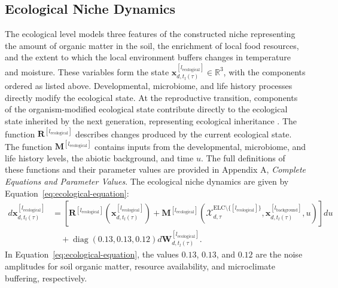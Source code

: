 \documentclass[11pt]{article}
\newcommand{\ELC}{\mathrm{ELC}}
\begin{document}
\subsection{Ecological Niche Dynamics}
The ecological level models three features of the constructed niche representing the amount of organic matter in the soil, the enrichment of local food resources, and the extent to which the local environment buffers changes in temperature and moisture. These variables form the state $\mathbf{x}^{[l_{\mathrm{ecological}}]}_{d,t_l(\tau)}\in\mathbb{R}^{3}$, with the components ordered as listed above. Developmental, microbiome, and life history processes directly modify the ecological state. At the reproductive transition, components of the organism-modified ecological state contribute directly to the ecological state inherited by the next generation, representing ecological inheritance \cite{odlingsmee2003,laland2016}. The function $\mathbf{R}^{[l_{\mathrm{ecological}}]}$ describes changes produced by the current ecological state. The function $\mathbf{M}^{[l_{\mathrm{ecological}}]}$ contains inputs from the developmental, microbiome, and life history levels, the abiotic background, and time $u$. The full definitions of these functions and their parameter values are provided in Appendix A, \textit{Complete Equations and Parameter Values}. The ecological niche dynamics are given by Equation~\ref{eq:ecological-equation}:
\begin{equation}
\begin{aligned}
d\mathbf{x}^{[l_{\mathrm{ecological}}]}_{d,t_l(\tau)}
&=
\left[
\mathbf{R}^{[l_{\mathrm{ecological}}]}\!\left(
\mathbf{x}^{[l_{\mathrm{ecological}}]}_{d,t_l(\tau)}
\right)
+
\mathbf{M}^{[l_{\mathrm{ecological}}]}\!\left(
\mathcal{X}^{\ELC\setminus\{[l_{\mathrm{ecological}}]\}}_{d,\tau},
\mathbf{x}^{[l_{\mathrm{background}}]}_{d,t_l(\tau)},
u
\right)
\right]du
\\
&\quad+
\operatorname{diag}(0.13,0.13,0.12)
d\mathbf{W}^{[l_{\mathrm{ecological}}]}_{d,t_l(\tau)} .
\end{aligned}
\label{eq:ecological-equation}
\end{equation}
In Equation~\ref{eq:ecological-equation}, the values $0.13$, $0.13$, and $0.12$ are the noise amplitudes for soil organic matter, resource availability, and microclimate buffering, respectively.
\end{document}
